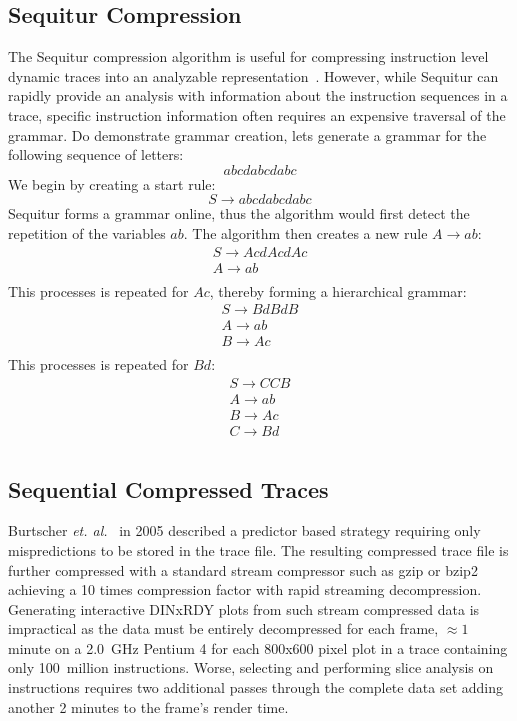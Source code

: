 \documentclass[defaultstyle,11pt]{thesis}
\begin{document}
\subsection{Sequitur Compression}

The Sequitur compression algorithm is useful for compressing
instruction level dynamic traces into an analyzable
representation~\cite{manning:97:dcc}.  However, while Sequitur can
rapidly provide an analysis with information about the instruction
sequences in a trace, specific instruction information often requires
an expensive traversal of the grammar.  Do demonstrate grammar
creation, lets generate a grammar for the following sequence of
letters:
$$
abcdabcdabc
$$
We begin by creating a start rule:
$$
S \rightarrow abcdabcdabc
$$
Sequitur forms a grammar online, thus the algorithm would first detect the repetition of the variables $ab$.  The algorithm then creates a new rule $A \rightarrow ab$:
$$
\begin{array}{lcll}
S \rightarrow AcdAcdAc\\
A \rightarrow ab\\
\end{array}
$$
This processes is repeated for $Ac$, thereby forming a hierarchical grammar:
$$
\begin{array}{lcll}
S \rightarrow BdBdB\\
A \rightarrow ab\\
B \rightarrow Ac\\
\end{array}
$$
This processes is repeated for $Bd$:
$$
\begin{array}{lcll}
S \rightarrow CCB\\
A \rightarrow ab\\
B \rightarrow Ac\\
C \rightarrow Bd\\
\end{array}
$$

\subsection{Sequential Compressed Traces}

Burtscher \textit{et. al.}~\cite{burtscher:05:cgo} in 2005 described a predictor
based strategy requiring only mispredictions to be stored in the trace
file. The resulting compressed trace file is further compressed with a
standard stream compressor such as gzip or bzip2 achieving a 10 times
compression factor with rapid streaming decompression. Generating
interactive DINxRDY plots from such stream compressed data is
impractical as the data must be entirely decompressed for each frame,
$\approx 1$ minute on a 2.0~GHz Pentium 4 for each 800x600 pixel
plot in a trace containing only 100~million instructions.  Worse,
selecting and performing slice analysis on instructions requires two
additional passes through the complete data set adding another 2
minutes to the frame's render time.
\end{document}
